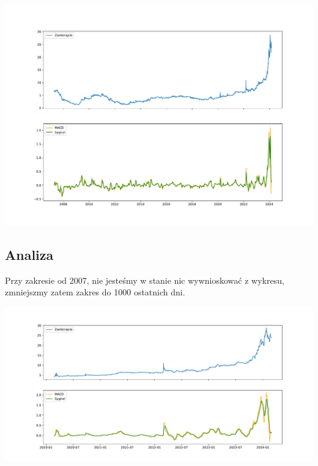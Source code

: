 \documentclass[
]{article}
\begin{document}
\includegraphics{macd_files/figure-latex/unnamed-chunk-1-1.pdf}

\subsection{Analiza}\label{analiza}

Przy zakresie od 2007, nie jesteśmy w stanie nic wywnioskować z wykresu,
zmniejszmy zatem zakres do 1000 ostatnich dni.

\includegraphics{macd_files/figure-latex/unnamed-chunk-2-3.pdf}
\end{document}
